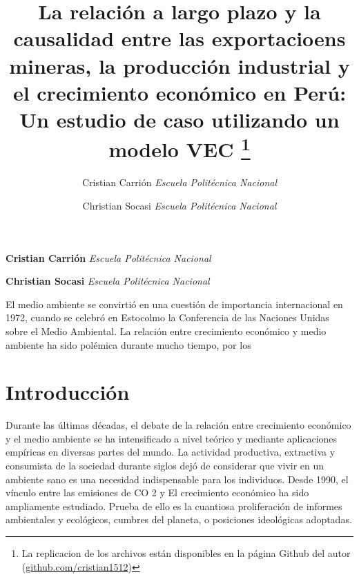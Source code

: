 \documentclass[11pt,]{article}
\title{La relación a largo plazo y la causalidad entre las exportacioens
mineras, la producción industrial y el crecimiento económico en Perú: Un estudio de caso utilizando un modelo VEC \thanks{La replicacion de los archivos están disponibles en la página Github del
autor (\href{https://github.com/cristian1512}{github.com/cristian1512})}  }
\author{\Large Cristian Carrión\vspace{0.05in} \newline\normalsize\emph{Escuela Politécnica Nacional}   \and \Large Christian Socasi\vspace{0.05in} \newline\normalsize\emph{Escuela Politécnica Nacional}  }
\date{}
\newcommand*{\authorfont}{\fontfamily{phv}\selectfont}
\renewenvironment{abstract}
 {{%
    \setlength{\leftmargin}{0mm}
    \setlength{\rightmargin}{\leftmargin}%
  }%
  \relax}
 {\endlist}
\begin{document}
	
%

{%
\setlength{\parindent}{0pt}
\thispagestyle{plain}
{\fontsize{18}{20}\selectfont\raggedright 
\maketitle  %

}

{
   \vskip 13.5pt\relax \normalsize\fontsize{11}{12} 
\textbf{\authorfont Cristian Carrión} \hskip 15pt \emph{\small Escuela Politécnica Nacional}   \par \textbf{\authorfont Christian Socasi} \hskip 15pt \emph{\small Escuela Politécnica Nacional}   

}

}








\begin{abstract}

    \hbox{\vrule height .2pt width 39.14pc}

    \vskip 8.5pt %

\noindent El medio ambiente se convirtió en una cuestión de importancia
internacional en 1972, cuando se celebró en Estocolmo la Conferencia de
las Naciones Unidas sobre el Medio Ambiental. La relación entre
crecimiento económico y medio ambiente ha sido polémica durante mucho
tiempo, por los


    \hbox{\vrule height .2pt width 39.14pc}


\end{abstract}


\vskip 6.5pt


\noindent  \hypertarget{introduccion}{%
\section{Introducción}\label{introduccion}}

Durante las últimas décadas, el debate de la relación entre crecimiento
económico y el medio ambiente se ha intensificado a nivel teórico y
mediante aplicaciones empíricas en diversas partes del mundo. La
actividad productiva, extractiva y consumista de la sociedad durante
siglos dejó de considerar que vivir en un ambiente sano es una necesidad
indispensable para los individuos. Desde 1990, el vínculo entre las
emisiones de CO 2 y El crecimiento económico ha sido ampliamente
estudiado. Prueba de ello es la cuantiosa proliferación de informes
ambientales y ecológicos, cumbres del planeta, o posiciones ideológicas
adoptadas.
\end{document}
